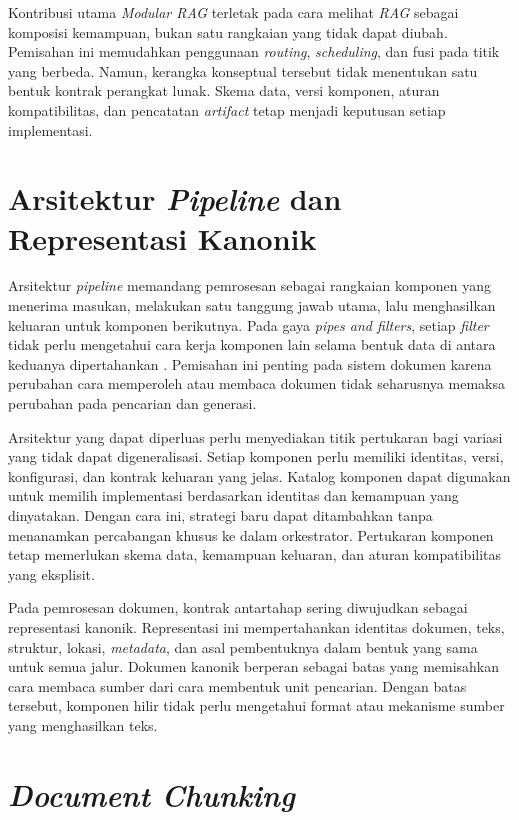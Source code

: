Kontribusi utama \emph{Modular RAG} terletak pada cara melihat \emph{RAG} sebagai komposisi kemampuan, bukan satu rangkaian yang tidak dapat diubah. Pemisahan ini memudahkan penggunaan \emph{routing}, \emph{scheduling}, dan fusi pada titik yang berbeda. Namun, kerangka konseptual tersebut tidak menentukan satu bentuk kontrak perangkat lunak. Skema data, versi komponen, aturan kompatibilitas, dan pencatatan \emph{artifact} tetap menjadi keputusan setiap implementasi.

\section{Arsitektur \emph{Pipeline} dan Representasi Kanonik}

Arsitektur \emph{pipeline} memandang pemrosesan sebagai rangkaian komponen yang menerima masukan, melakukan satu tanggung jawab utama, lalu menghasilkan keluaran untuk komponen berikutnya. Pada gaya \emph{pipes and filters}, setiap \emph{filter} tidak perlu mengetahui cara kerja komponen lain selama bentuk data di antara keduanya dipertahankan \parencite{garlanIntroductionSoftware1994}. Pemisahan ini penting pada sistem dokumen karena perubahan cara memperoleh atau membaca dokumen tidak seharusnya memaksa perubahan pada pencarian dan generasi.

Arsitektur yang dapat diperluas perlu menyediakan titik pertukaran bagi variasi
yang tidak dapat digeneralisasi. Setiap komponen perlu memiliki identitas, versi,
konfigurasi, dan kontrak keluaran yang jelas. Katalog komponen dapat digunakan
untuk memilih implementasi berdasarkan identitas dan kemampuan yang dinyatakan.
Dengan cara ini, strategi baru dapat ditambahkan tanpa menanamkan percabangan
khusus ke dalam orkestrator. Pertukaran komponen tetap memerlukan skema data,
kemampuan keluaran, dan aturan kompatibilitas yang eksplisit.

Pada pemrosesan dokumen, kontrak antartahap sering diwujudkan sebagai representasi kanonik. Representasi ini mempertahankan identitas dokumen, teks, struktur, lokasi, \emph{metadata}, dan asal pembentuknya dalam bentuk yang sama untuk semua jalur. Dokumen kanonik berperan sebagai batas yang memisahkan cara membaca sumber dari cara membentuk unit pencarian. Dengan batas tersebut, komponen hilir tidak perlu mengetahui format atau mekanisme sumber yang menghasilkan teks.

\section{\emph{Document Chunking}}

